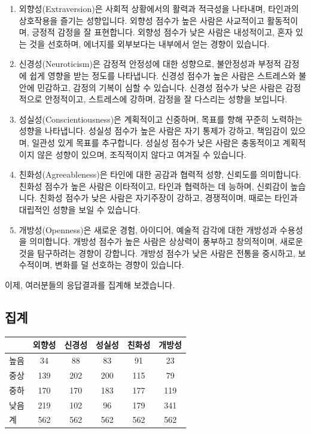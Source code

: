 \documentclass[
]{book}
\begin{document}
\begin{enumerate}
\def\labelenumi{\arabic{enumi}.}
\item
  외향성(Extraversion)은 사회적 상황에서의 활력과 적극성을 나타내며, 타인과의 상호작용을 즐기는 성향입니다. 외향성 점수가 높은 사람은 사교적이고 활동적이며, 긍정적 감정을 잘 표현합니다. 외향성 점수가 낮은 사람은 내성적이고, 혼자 있는 것을 선호하며, 에너지를 외부보다는 내부에서 얻는 경향이 있습니다.
\item
  신경성(Neuroticism)은 감정적 안정성에 대한 성향으로, 불안정성과 부정적 감정에 쉽게 영향을 받는 정도를 나타냅니다. 신경성 점수가 높은 사람은 스트레스와 불안에 민감하고, 감정의 기복이 심할 수 있습니다. 신경성 점수가 낮은 사람은 감정적으로 안정적이고, 스트레스에 강하며, 감정을 잘 다스리는 성향을 보입니다.
\item
  성실성(Conscientiousness)은 계획적이고 신중하며, 목표를 향해 꾸준히 노력하는 성향을 나타냅니다. 성실성 점수가 높은 사람은 자기 통제가 강하고, 책임감이 있으며, 일관성 있게 목표를 추구합니다. 성실성 점수가 낮은 사람은 충동적이고 계획적이지 않은 성향이 있으며, 조직적이지 않다고 여겨질 수 있습니다.
\item
  친화성(Agreeableness)은 타인에 대한 공감과 협력적 성향, 신뢰도를 의미합니다. 친화성 점수가 높은 사람은 이타적이고, 타인과 협력하는 데 능하며, 신뢰감이 높습니다. 친화성 점수가 낮은 사람은 자기주장이 강하고, 경쟁적이며, 때로는 타인과 대립적인 성향을 보일 수 있습니다.
\item
  개방성(Openness)은 새로운 경험, 아이디어, 예술적 감각에 대한 개방성과 수용성을 의미합니다. 개방성 점수가 높은 사람은 상상력이 풍부하고 창의적이며, 새로운 것을 탐구하려는 경향이 강합니다. 개방성 점수가 낮은 사람은 전통을 중시하고, 보수적이며, 변화를 덜 선호하는 경향이 있습니다.
\end{enumerate}

이제, 여러분들의 응답결과를 집계해 보겠습니다.

\subsection{집계}\label{uxc9d1uxacc4-56}

\begin{tabular}{l|c|c|c|c|c}
\hline
  & 외향성 & 신경성 & 성실성 & 친화성 & 개방성\\
\hline
높음 & 34 & 88 & 83 & 91 & 23\\
\hline
중상 & 139 & 202 & 200 & 115 & 79\\
\hline
중하 & 170 & 170 & 183 & 177 & 119\\
\hline
낮음 & 219 & 102 & 96 & 179 & 341\\
\hline
계 & 562 & 562 & 562 & 562 & 562\\
\hline
\end{tabular}
\end{document}

